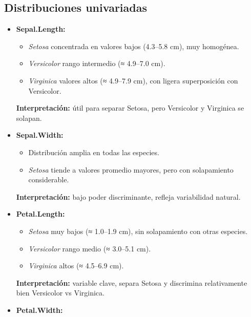 \documentclass[
  spanish,
  11pt,
  a4paper,
  DIV=11,
  numbers=noendperiod]{scrartcl}
\providecommand{\tightlist}{%
  \setlength{\itemsep}{0pt}\setlength{\parskip}{0pt}}
\begin{document}
\subsection{Distribuciones
univariadas}\label{distribuciones-univariadas}

\begin{itemize}
\item
  \textbf{Sepal.Length:}

  \begin{itemize}
  \tightlist
  \item
    \emph{Setosa} concentrada en valores bajos (4.3--5.8 cm), muy
    homogénea.\\
  \item
    \emph{Versicolor} rango intermedio (≈ 4.9--7.0 cm).\\
  \item
    \emph{Virginica} valores altos (≈ 4.9--7.9 cm), con ligera
    superposición con Versicolor.
  \end{itemize}

  \textbf{Interpretación:} útil para separar Setosa, pero Versicolor y
  Virginica se solapan.
\item
  \textbf{Sepal.Width:}

  \begin{itemize}
  \tightlist
  \item
    Distribución amplia en todas las especies.\\
  \item
    \emph{Setosa} tiende a valores promedio mayores, pero con
    solapamiento considerable.
  \end{itemize}

  \textbf{Interpretación:} bajo poder discriminante, refleja
  variabilidad natural.
\item
  \textbf{Petal.Length:}

  \begin{itemize}
  \tightlist
  \item
    \emph{Setosa} muy bajos (≈ 1.0--1.9 cm), sin solapamiento con otras
    especies.\\
  \item
    \emph{Versicolor} rango medio (≈ 3.0--5.1 cm).\\
  \item
    \emph{Virginica} altos (≈ 4.5--6.9 cm).
  \end{itemize}

  \textbf{Interpretación:} variable clave, separa Setosa y discrimina
  relativamente bien Versicolor vs Virginica.
\item
  \textbf{Petal.Width:}


\end{itemize}
\end{document}
